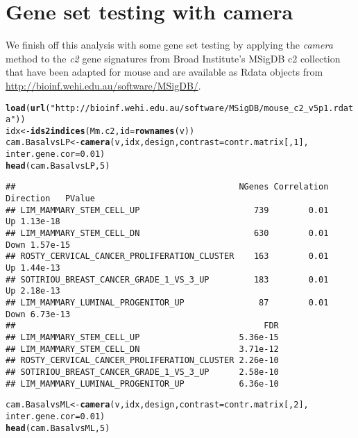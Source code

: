 \documentclass[10pt,a4paper]{extarticle}\usepackage[]{graphicx}\usepackage[]{color}
\makeatletter
\newcommand{\hlnum}[1]{\textcolor[rgb]{0.686,0.059,0.569}{#1}}%
\newcommand{\hlstr}[1]{\textcolor[rgb]{0.192,0.494,0.8}{#1}}%
\newcommand{\hlstd}[1]{\textcolor[rgb]{0.345,0.345,0.345}{#1}}%
\newcommand{\hlkwb}[1]{\textcolor[rgb]{0.69,0.353,0.396}{#1}}%
\newcommand{\hlkwc}[1]{\textcolor[rgb]{0.333,0.667,0.333}{#1}}%
\newcommand{\hlkwd}[1]{\textcolor[rgb]{0.737,0.353,0.396}{\textbf{#1}}}%
\newenvironment{kframe}{%
 \def\at@end@of@kframe{}%
 \ifinner\ifhmode%
  \def\at@end@of@kframe{\end{minipage}}%
  \begin{minipage}{\columnwidth}%
 \fi\fi%
 \def\FrameCommand##1{\hskip\@totalleftmargin \hskip-\fboxsep
 \colorbox{shadecolor}{##1}\hskip-\fboxsep
     \hskip-\linewidth \hskip-\@totalleftmargin \hskip\columnwidth}%
 \MakeFramed {\advance\hsize-\width
   \@totalleftmargin\z@ \linewidth\hsize
   \@setminipage}}%
 {\par\unskip\endMakeFramed%
 \at@end@of@kframe}
\newenvironment{knitrout}{}{} %
\makeatother
\begin{document}
\section*{Gene set testing with camera}

We finish off this analysis with some gene set testing by applying the {\it camera} method \cite{Wu2012} to the {\it c2} gene signatures from Broad Institute's MSigDB c2 collection \cite{Subramanianetal:PNAS:2005} that have been adapted for mouse and are available as Rdata objects from \url{http://bioinf.wehi.edu.au/software/MSigDB/}. 
\begin{knitrout}
\color{fgcolor}\begin{kframe}
\begin{alltt}
\hlkwd{load}\hlstd{(}\hlkwd{url}\hlstd{(}\hlstr{"http://bioinf.wehi.edu.au/software/MSigDB/mouse_c2_v5p1.rdata"}\hlstd{))}
\hlstd{idx} \hlkwb{<-} \hlkwd{ids2indices}\hlstd{(Mm.c2,}\hlkwc{id}\hlstd{=}\hlkwd{rownames}\hlstd{(v))}
\hlstd{cam.BasalvsLP} \hlkwb{<-} \hlkwd{camera}\hlstd{(v,idx,design,}\hlkwc{contrast}\hlstd{=contr.matrix[,}\hlnum{1}\hlstd{],}
                        \hlkwc{inter.gene.cor}\hlstd{=}\hlnum{0.01}\hlstd{)}
\hlkwd{head}\hlstd{(cam.BasalvsLP,}\hlnum{5}\hlstd{)}
\end{alltt}
\begin{verbatim}
##                                             NGenes Correlation Direction   PValue
## LIM_MAMMARY_STEM_CELL_UP                       739        0.01        Up 1.13e-18
## LIM_MAMMARY_STEM_CELL_DN                       630        0.01      Down 1.57e-15
## ROSTY_CERVICAL_CANCER_PROLIFERATION_CLUSTER    163        0.01        Up 1.44e-13
## SOTIRIOU_BREAST_CANCER_GRADE_1_VS_3_UP         183        0.01        Up 2.18e-13
## LIM_MAMMARY_LUMINAL_PROGENITOR_UP               87        0.01      Down 6.73e-13
##                                                  FDR
## LIM_MAMMARY_STEM_CELL_UP                    5.36e-15
## LIM_MAMMARY_STEM_CELL_DN                    3.71e-12
## ROSTY_CERVICAL_CANCER_PROLIFERATION_CLUSTER 2.26e-10
## SOTIRIOU_BREAST_CANCER_GRADE_1_VS_3_UP      2.58e-10
## LIM_MAMMARY_LUMINAL_PROGENITOR_UP           6.36e-10
\end{verbatim}
\begin{alltt}
\hlstd{cam.BasalvsML} \hlkwb{<-} \hlkwd{camera}\hlstd{(v,idx,design,}\hlkwc{contrast}\hlstd{=contr.matrix[,}\hlnum{2}\hlstd{],}
                        \hlkwc{inter.gene.cor}\hlstd{=}\hlnum{0.01}\hlstd{)}
\hlkwd{head}\hlstd{(cam.BasalvsML,}\hlnum{5}\hlstd{)}

\end{alltt}
\end{kframe}
\end{knitrout}
\end{document}
